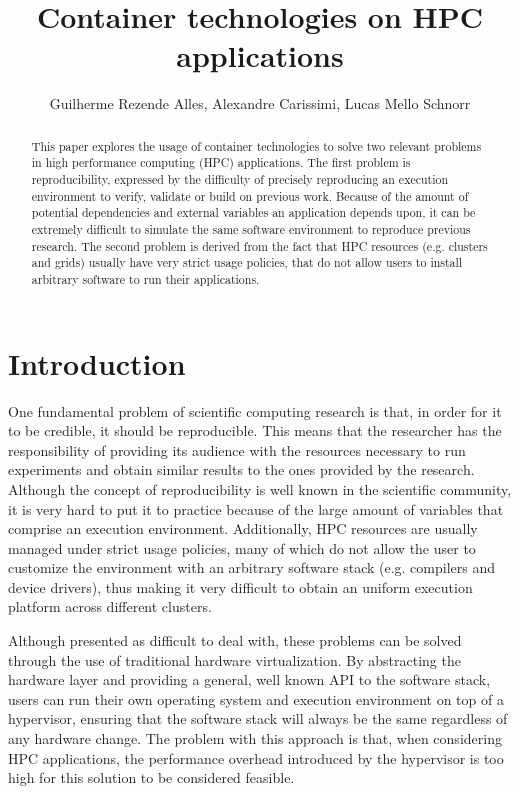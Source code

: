 \documentclass[12pt]{article}
\title{Container technologies on HPC applications}
\author{Guilherme Rezende Alles\inst{1}, Alexandre Carissimi\inst{1},
  Lucas Mello Schnorr\inst{1}}
\begin{document}
 

\maketitle

\begin{abstract}
  This paper explores the usage of container technologies to solve two relevant problems in high performance computing (HPC) applications. The first problem is reproducibility, expressed by the difficulty of precisely reproducing an execution environment to verify, validate or build on previous work. Because of the amount of potential dependencies and external variables an application depends upon, it can be extremely difficult to simulate the same software environment to reproduce previous research. The second problem is derived from the fact that HPC resources (e.g. clusters and grids) usually have very strict usage policies, that do not allow users to install arbitrary software to run their applications.
\end{abstract}

\section{Introduction}
One fundamental problem of scientific computing research is that, in order for it to be credible, it should be reproducible. This means that the researcher has the responsibility of providing its audience with the resources necessary to run experiments and obtain similar results to the ones provided by the research. Although the concept of reproducibility is well known in the scientific community, it is very hard to put it to practice because of the large amount of variables that comprise an execution environment. Additionally, HPC resources are usually managed under strict usage policies, many of which do not allow the user to customize the environment with an arbitrary software stack (e.g. compilers and device drivers), thus making it very difficult to obtain an uniform execution platform across different clusters.

Although presented as difficult to deal with, these problems can be solved through the use of traditional hardware virtualization. By abstracting the hardware layer and providing a general, well known API to the software stack, users can run their own operating system and execution environment on top of a hypervisor, ensuring that the software stack will always be the same regardless of any hardware change. The problem with this approach is that, when considering HPC applications, the performance overhead introduced by the hypervisor is too high for this solution to be considered feasible.
\end{document}
